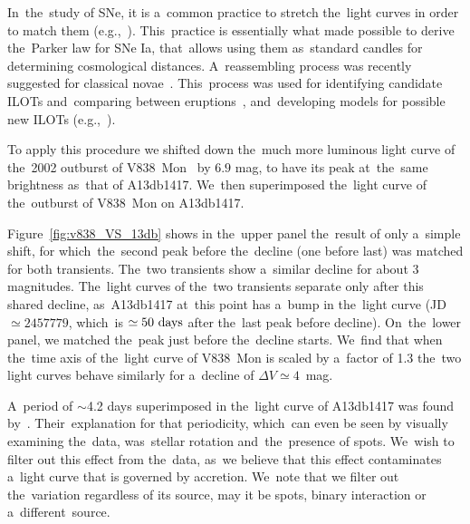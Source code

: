 \documentclass[galaxies,article,accept,moreauthors,pdftex]{mdpi}
\def \days{~\rm{days}}
\begin{document}
In~the~study of SNe, it is a~common practice to stretch the~light curves in order to match them (e.g.,~\cite{Goldhaberetal2001,Conleyetal2008}). This~practice is essentially what made possible to derive the~Parker law for SNe Ia, that~allows using them as~standard candles for determining cosmological distances. A~reassembling process was recently suggested for classical novae~\citep{HachisuKato2019}. This~process was used for identifying candidate ILOTs and~comparing between eruptions~\citep{Kashietal2010}, and~developing models for possible new ILOTs (e.g.,~\cite{Bearetal2011}).

To apply this procedure we shifted down the~much more luminous light curve of the~2002 outburst of V838~Mon~\citep{Bondetal2003,Starrfieldetal2005,Sparksetal2008} by $6.9$ mag, to have its peak at~the~same brightness as~that of A13db1417.
We~then superimposed the~light curve of the~outburst of V838~Mon on A13db1417.

Figure~\ref{fig:v838_VS_13db} shows in the~upper panel the~result of only a~simple shift, for which~the~second peak before the~decline (one before last) was matched for both transients.
The~two transients show a~similar decline for about 3 magnitudes.
The~light curves of the~two transients separate only after this shared decline, as~A13db1417 at~this point has a~bump in the~light curve (JD$\simeq2457779$, which~is $\simeq50 \days$ after the~last peak before decline).
On~the~lower panel, we matched the~peak just before the~decline starts. We~find that when the~time axis of the~light curve of V838~Mon is scaled by a~factor of 1.3 the~two light curves behave similarly for a~decline of $\Delta V \simeq 4$~mag.

A~period of $\sim$4.2 days superimposed in the~light curve of A13db1417 was found by~\cite{SiciliaAguilaretal2017}. Their~explanation for that periodicity, which~can even be seen by visually examining the~data, was~stellar rotation and~the~presence of spots. We~wish to filter out this effect from the~data, as~we believe that this effect contaminates a~light curve that is governed by accretion. We~note that we filter out the~variation regardless of its source, may it be spots, binary interaction or a~different~source.
\end{document}
